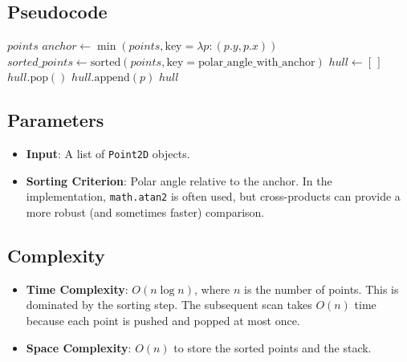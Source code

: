 

\subsection{Pseudocode}

\begin{algorithm}[htbp]
\caption{Graham Scan for Convex Hull}
\label{alg:graham_scan}
\begin{algorithmic}[1]
    \State \Return $points$
  \EndIf
  \State $anchor \gets \min(points, \text{key}=\lambda p: (p.y, p.x))$
  \State $sorted\_points \gets \text{sorted}(points, \text{key}=\text{polar\_angle\_with\_anchor})$
  \State $hull \gets [\,]$
      \State $hull.\text{pop}()$
    \EndWhile
    \State $hull.\text{append}(p)$
  \EndFor
  \State \Return $hull$
\EndFunction
\end{algorithmic}
\end{algorithm}

\subsection{Parameters}

\begin{itemize}
\item \textbf{Input}: A list of \texttt{Point2D} objects.
\item \textbf{Sorting Criterion}: Polar angle relative to the anchor. In the implementation, \texttt{math.atan2} is often used, but cross-products can provide a more robust (and sometimes faster) comparison.
\end{itemize}

\subsection{Complexity}

\begin{itemize}
\item \textbf{Time Complexity}: $O(n \log n)$, where $n$ is the number of points. This is dominated by the sorting step. The subsequent scan takes $O(n)$ time because each point is pushed and popped at most once.
\item \textbf{Space Complexity}: $O(n)$ to store the sorted points and the stack.
\end{itemize}

